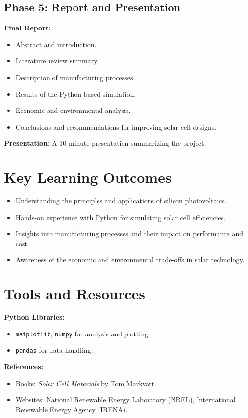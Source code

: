 \documentclass[11pt]{article}
\begin{document}
\subsection*{Phase 5: Report and Presentation}
\textbf{Final Report:}
\begin{itemize}
    \item Abstract and introduction.
    \item Literature review summary.
    \item Description of manufacturing processes.
    \item Results of the Python-based simulation.
    \item Economic and environmental analysis.
    \item Conclusions and recommendations for improving solar cell designs.
\end{itemize}
\textbf{Presentation:} A 10-minute presentation summarizing the project.

\section*{Key Learning Outcomes}
\begin{itemize}
    \item Understanding the principles and applications of silicon photovoltaics.
    \item Hands-on experience with Python for simulating solar cell efficiencies.
    \item Insights into manufacturing processes and their impact on performance and cost.
    \item Awareness of the economic and environmental trade-offs in solar technology.
\end{itemize}

\section*{Tools and Resources}
\textbf{Python Libraries:}
\begin{itemize}
    \item \texttt{matplotlib}, \texttt{numpy} for analysis and plotting.
    \item \texttt{pandas} for data handling.
\end{itemize}
\textbf{References:}
\begin{itemize}
    \item Books: \textit{Solar Cell Materials} by Tom Markvart.
    \item Websites: National Renewable Energy Laboratory (NREL), International Renewable Energy Agency (IRENA).
\end{itemize}
\end{document}
